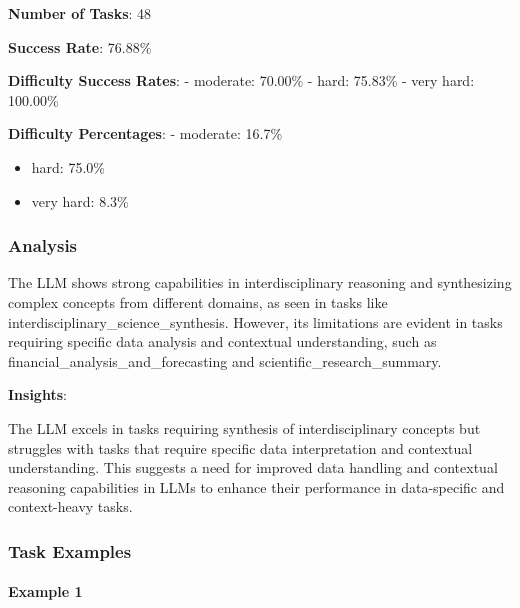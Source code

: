 \documentclass[fleqn,10pt]{wlscirep}
\begin{document}
\textbf{Number of Tasks}: 48

\textbf{Success Rate}: 76.88\%

\textbf{Difficulty Success Rates}: - moderate: 70.00\% - hard: 75.83\% -
very hard: 100.00\%

\textbf{Difficulty Percentages}: - moderate: 16.7\%

\begin{itemize}
\item
  hard: 75.0\%
\item
  very hard: 8.3\%
\end{itemize}

\hypertarget{analysis-17}{%
\subsubsection{Analysis}\label{analysis-17}}

The LLM shows strong capabilities in interdisciplinary reasoning and
synthesizing complex concepts from different domains, as seen in tasks
like interdisciplinary\_science\_synthesis. However, its limitations are
evident in tasks requiring specific data analysis and contextual
understanding, such as financial\_analysis\_and\_forecasting and
scientific\_research\_summary.

\textbf{Insights}:

The LLM excels in tasks requiring synthesis of interdisciplinary
concepts but struggles with tasks that require specific data
interpretation and contextual understanding. This suggests a need for
improved data handling and contextual reasoning capabilities in LLMs to
enhance their performance in data-specific and context-heavy tasks.

\hypertarget{task-examples-18}{%
\subsubsection{Task Examples}\label{task-examples-18}}

\hypertarget{example-1-18}{%
\paragraph{Example 1}\label{example-1-18}}
\end{document}
